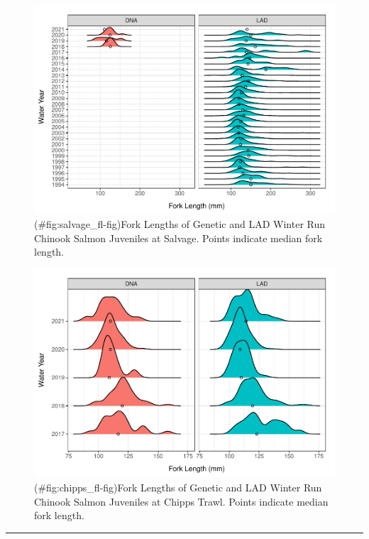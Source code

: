 \documentclass[
]{book}
\theoremstyle{definition}
\theoremstyle{definition}
\theoremstyle{definition}
\theoremstyle{definition}
\theoremstyle{remark}
\begin{document}
\begin{figure}
\centering
\includegraphics{_main_files/figure-latex/salvage_fl-fig-1.pdf}
\caption{(\#fig:salvage\_fl-fig)Fork Lengths of Genetic and LAD Winter Run Chinook Salmon Juveniles at Salvage. Points indicate median fork length.}
\end{figure}

\begin{figure}
\centering
\includegraphics{_main_files/figure-latex/chipps_fl-fig-1.pdf}
\caption{(\#fig:chipps\_fl-fig)Fork Lengths of Genetic and LAD Winter Run Chinook Salmon Juveniles at Chipps Trawl. Points indicate median fork length.}
\end{figure}

\begin{center}\rule{0.5\linewidth}{0.5pt}\end{center}
\end{document}

